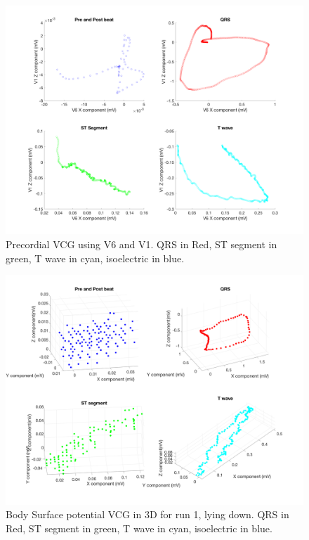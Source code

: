 \documentclass[12pt]{article}
\begin{document}
\begin{figure}[H]
	
	\centering
	\includegraphics[width = .75\textwidth]{Figures/Precordial_V1V6.png}
	\caption{Precordial VCG using V6 and V1. QRS in Red, ST segment in green, T wave in cyan, isoelectric in blue.}
	\label{fig:PrecordVect}
\end{figure}

\begin{figure}[H]
	
	\centering
	\includegraphics[width = .75\textwidth]{Figures/BSP_run1_3d.png}
	\caption{Body Surface potential VCG in 3D for run 1, lying down. QRS in Red, ST segment in green, T wave in cyan, isoelectric in blue.}
	\label{fig:BSP1}
\end{figure}
\end{document}
